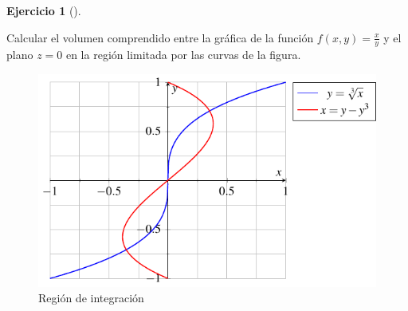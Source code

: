 \documentclass[
  a4paper,
]{scrreport}
\theoremstyle{definition}
\newtheorem{exercise}{Ejercicio}[chapter]
\theoremstyle{remark}
\begin{document}
\begin{exercise}[]\protect\hypertarget{exr-6}{}\label{exr-6}

Calcular el volumen comprendido entre la gráfica de la función
\(f(x,y)=\frac{x}{y}\) y el plano \(z=0\) en la región limitada por las
curvas de la figura.

\begin{figure}[H]

{\centering \includegraphics[width=12cm,height=\textheight,keepaspectratio]{img/examen-2024-12-20/region-integracion.pdf}

}

\caption{Región de integración}

\end{figure}%

\end{exercise}
\end{document}
